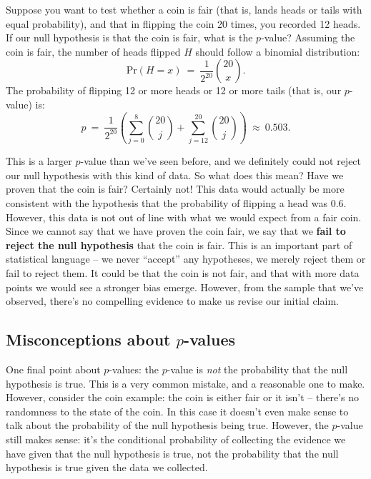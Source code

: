 Suppose you want to test whether a coin is fair (that is, lands heads or tails with equal probability), and that in flipping the coin 20 times, you recorded 12 heads.  If our null hypothesis is that the coin is fair, what is the $p$-value? Assuming the coin is fair, the number of heads flipped $H$ should follow a binomial distribution:
\begin{equation*}
\textrm{Pr}(H=x)\ = \ \frac{1}{2^{20}}{20 \choose x}.
\end{equation*}
The probability of flipping 12 or more heads or 12 or more tails (that is, our $p$-value) is:$$
p\ = \ \frac{1}{2^{20}}\left(\sum_{j=0}^{8}{20 \choose j}+\sum_{j=12}^{20}{20 \choose j}\right)\ \approx \ 0.503.$$

This is a larger $p$-value than we've seen before, and we definitely could not reject our null hypothesis with this kind of data.  So what does this mean? Have we proven that the coin is fair? Certainly not! This data would actually be more consistent with the hypothesis that the probability of flipping a head was 0.6. However, this data is not out of line with what we would expect from a fair coin. Since we cannot say that we have proven the coin fair, we say that we \textbf{fail to reject the null hypothesis} that the coin is fair. This is an important part of statistical language -- we never ``accept'' any hypotheses, we merely reject them or fail to reject them. It could be that the coin is not fair, and that with more data points we would see a stronger bias emerge. However, from the sample that we've observed, there's no compelling evidence to make us revise our initial claim.



\subsection{Misconceptions about $p$-values}

One final point about $p$-values: the $p$-value is \emph{not }the probability that the null hypothesis is true. This is a very common mistake, and a reasonable one to make. However, consider the coin example: the coin is either fair or it isn't -- there's no randomness to the state of the coin.  In this case it doesn't even make sense to talk about the probability of the null hypothesis being true. However, the $p$-value still makes sense: it's the conditional probability of collecting the evidence we have given that the null hypothesis is true, not the probability that the null hypothesis is true given the data we collected.

